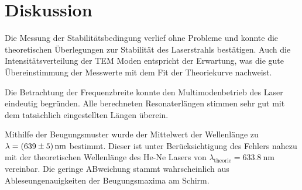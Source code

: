 \section{Diskussion}
\label{sec:Diskussion}
Die Messung der Stabilitätsbedingung verlief ohne Probleme und konnte die theoretischen
Überlegungen zur Stabilität des Laserstrahls bestätigen.
Auch die Intensitätsverteilung der TEM Moden entspricht der Erwartung, was die gute
Übereinstimmung der Messwerte mit dem Fit der Theoriekurve nachweist.

Die Betrachtung der Frequenzbreite konnte den Multimodenbetrieb des Laser eindeutig begründen.
Alle berechneten Resonaterlängen stimmen sehr gut mit dem tatsächlich eingestellten Längen überein.

Mithilfe der Beugungsmuster wurde der Mittelwert der Wellenlänge zu $\lambda =\qty{639+-5}{\nano\metre}$
bestimmt. Dieser ist unter Berücksichtigung des Fehlers nahezu mit der theoretischen Wellenlänge \cite{laser} des
He-Ne Lasers von $\lambda_{\text{theorie}} =\qty{633.8}{\nano\metre}$ vereinbar.
Die geringe ABweichung stammt wahrscheinlich aus Ableseungenauigkeiten der Beugungsmaxima am Schirm.